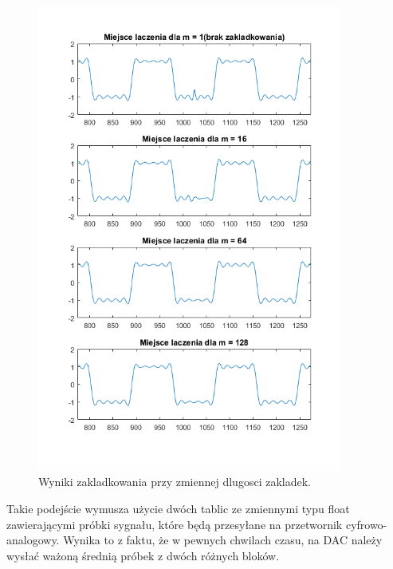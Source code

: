 \begin{figure}[H]
	\centering
	\includegraphics[width=10cm]{grafiki/sub_overlaps}
	\captionsetup{justification=centering}
	\caption{Wyniki zakladkowania przy zmiennej dlugosci zakladek.}
	\label{rys:sub_overlaps}
\end{figure}

Takie podejście wymusza użycie dwóch tablic ze zmiennymi typu float zawierającymi próbki sygnału, które będą przesyłane na przetwornik cyfrowo-analogowy. Wynika to z faktu, że w pewnych chwilach czasu, na DAC należy wysłać ważoną średnią próbek z dwóch różnych bloków. 

